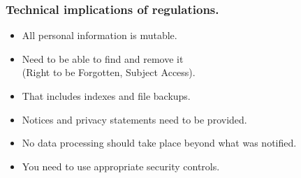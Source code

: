 \documentclass{beamer} %
\begin{document}
\begin{frame}
\frametitle{Technical implications of regulations.}

\begin{itemize}
	\item All personal information is mutable.
	\item Need to be able to find and remove it \\ (Right to be Forgotten, Subject Access).
	\item That includes indexes and file backups.
	\item Notices and privacy statements need to be provided.
	\item No data processing should take place beyond what was notified.
	\item You need to use appropriate security controls.
\end{itemize}

\end{frame}



\end{document}
